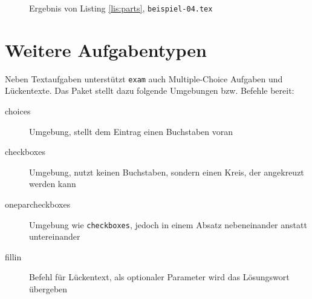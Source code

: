 \begin{figure}[b]
\caption{Ergebnis von Listing \ref{lis:parts}, \texttt{beispiel-04.tex}}\label{fig:allparts}
\end{figure}


\section{Weitere Aufgabentypen}

Neben Textaufgaben unterstützt \texttt{exam} auch Multiple-Choice Aufgaben und Lückentexte. Das Paket stellt dazu folgende Umgebungen bzw. Befehle bereit:

\begin{description}
\item[choices] Umgebung, stellt dem Eintrag einen Buchstaben voran
\item[checkboxes] Umgebung, nutzt keinen Buchstaben, sondern einen Kreis, der angekreuzt werden kann
\item[oneparcheckboxes] Umgebung wie \texttt{checkboxes}, jedoch in einem Absatz nebeneinander anstatt untereinander
\item[fillin] Befehl für Lückentext, als optionaler Parameter wird das Lösungswort übergeben
\end{description}

